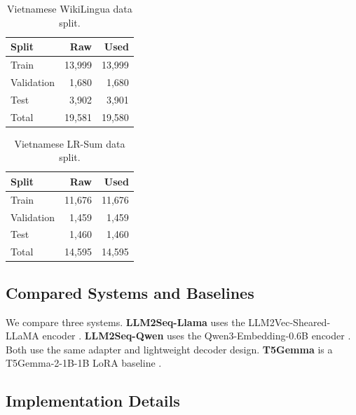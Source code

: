 \documentclass[11pt]{article}
\begin{document}
\begin{table}[htbp]
\centering
\small
\begin{tabular}{lrr}
\toprule
Split & Raw & Used \\
\midrule
Train & 13,999 & 13,999 \\
Validation & 1,680 & 1,680 \\
Test & 3,902 & 3,901 \\
\midrule
Total & 19,581 & 19,580 \\
\bottomrule
\end{tabular}
\caption{Vietnamese WikiLingua data split.}
\label{tab:data-split}
\end{table}

\begin{table}[htbp]
\centering
\small
\begin{tabular}{lrr}
\toprule
Split & Raw & Used \\
\midrule
Train & 11,676 & 11,676 \\
Validation & 1,459 & 1,459 \\
Test & 1,460 & 1,460 \\
\midrule
Total & 14,595 & 14,595 \\
\bottomrule
\end{tabular}
\caption{Vietnamese LR-Sum data split.}
\label{tab:lrsum-data-split}
\end{table}

\subsection{Compared Systems and Baselines}

We compare three systems.
\textbf{LLM2Seq-Llama} uses the LLM2Vec-Sheared-LLaMA encoder \citep{behnamghader2024llm2vec}.
\textbf{LLM2Seq-Qwen} uses the Qwen3-Embedding-0.6B encoder \citep{zhang2025qwen3embedding}.
Both use the same adapter and lightweight decoder design.
\textbf{T5Gemma} is a T5Gemma-2-1B-1B LoRA baseline \citep{zhang2025t5gemma2,hu2022lora}.

\subsection{Implementation Details}
\end{document}
